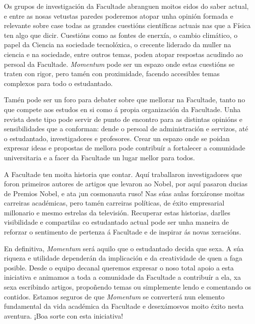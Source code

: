 \begin{multicols}{2}
Os grupos de investigación da Facultade abranguen moitos eidos do saber actual,
e entre as nosas vetustas paredes poderemos atopar unha opinión formada e
relevante sobre case todas as grandes cuestións científicas actuais nas que a
Física ten algo que dicir. Cuestións como as fontes de enerxía, o cambio
climático, o papel da Ciencia na sociedade tecnolóxica, o crecente liderado da
muller na ciencia e na sociedade, entre outros temas, poden atopar respostas
acudindo ao persoal da Facultade. \textit{Momentum} pode ser un espazo onde
estas cuestións se traten con rigor, pero tamén con proximidade, facendo
accesibles temas complexos para todo o estudantado.

Tamén pode ser un foro para debater sobre que mellorar na Facultade, tanto no
que compete aos estudos en si como á propia organización da Facultade. Unha
revista deste tipo pode servir de punto de encontro para as distintas opinións
e sensibilidades que a conforman: dende o persoal de administración e servizos,
até o estudantado, investigadores e profesores. Crear un espazo onde se poidan
expresar ideas e propostas de mellora pode contribuír a fortalecer a comunidade
universitaria e a facer da Facultade un lugar mellor para todos.

A Facultade ten moita historia que contar. Aquí traballaron investigadores que
foron primeiros autores de artigos que levaron ao Nobel, por aquí pasaron
ducias de Premios Nobel, e ata ¡un cosmonauta ruso! Nas súas aulas forxáronse
moitas carreiras académicas, pero tamén carreiras políticas, de éxito
empresarial millonario e mesmo estrelas da televisión. Recuperar estas
historias, darlles visibilidade e compartilas co estudantado actual pode ser
unha maneira de reforzar o sentimento de pertenza á Facultade e de inspirar ás
novas xeracións.

En definitiva, \textit{Momentum} será aquilo que o estudantado decida que sexa.
A súa riqueza e utilidade dependerán da implicación e da creatividade de quen a
faga posible. Desde o equipo decanal queremos expresar o noso total apoio a
esta iniciativa e animamos a toda a comunidade da Facultade a contribuír a ela,
xa sexa escribindo artigos, propoñendo temas ou simplemente lendo e comentando
os contidos. Estamos seguros de que \textit{Momentum} se converterá nun
elemento fundamental da vida académica da Facultade e desexámosvos moito éxito
nesta aventura. ¡Boa sorte con esta iniciativa!

\end{multicols}
